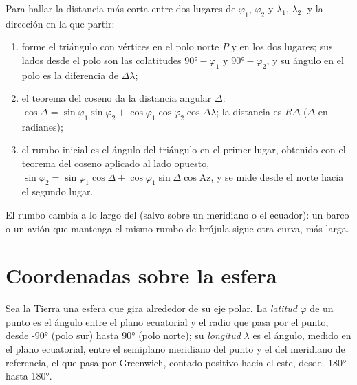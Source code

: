 \begin{method}\label{met:b1:spherical-astronomy:great-circle}
Para hallar la distancia más corta entre dos lugares de  $\varphi_1$,
$\varphi_2$ y  $\lambda_1$, $\lambda_2$, y la dirección en la que
partir:
\begin{enumerate}
  \item forme el triángulo con vértices en el polo norte $P$ y en los dos
        lugares; sus lados desde el polo son las colatitudes $\ang{90} -
        \varphi_1$ y $\ang{90} - \varphi_2$, y su ángulo en el polo es la
        diferencia de  $\Delta\lambda$;
  \item el teorema del coseno da la distancia angular $\Delta$:
        $\cos\Delta = \sin\varphi_1\sin\varphi_2 +
        \cos\varphi_1\cos\varphi_2\cos\Delta\lambda$; la distancia es
        $R\Delta$ ($\Delta$ en radianes);
  \item el rumbo inicial es el ángulo del triángulo en el primer lugar, obtenido
        con el teorema del coseno aplicado al lado opuesto,
        $\sin\varphi_2 = \sin\varphi_1\cos\Delta + \cos\varphi_1\sin\Delta\cos
        \mathrm{Az}$, y se mide desde el norte hacia el segundo lugar.
\end{enumerate}
El rumbo cambia a lo largo del  (salvo sobre un meridiano o el
ecuador): un barco o un avión que mantenga el mismo rumbo de brújula sigue otra
curva, más larga.
\end{method}

\section{Coordenadas sobre la esfera}

\begin{definition}\label{def:b1:spherical-astronomy:geographic}
Sea la Tierra una esfera que gira alrededor de su eje polar. La
\emph{latitud} $\varphi$ de un punto es el ángulo entre el plano
ecuatorial y el radio que pasa por el punto, desde \ang{-90} (polo sur) hasta
\ang{+90} (polo norte); su \emph{longitud} $\lambda$ es el ángulo,
medido en el plano ecuatorial, entre el semiplano meridiano del punto y el del
meridiano de referencia, el que pasa por Greenwich, contado positivo hacia el
este, desde \ang{-180} hasta \ang{180}.
\end{definition}


